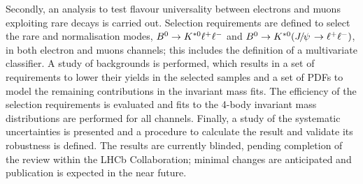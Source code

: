 Secondly, an analysis to test flavour universality between electrons and muons exploiting rare decays is carried out.
Selection requirements are defined to select the rare and normalisation modes, $B^0\rightarrow K^{*0}\ell^+ \ell^-$ 
and $\Bz\to\Kstarz(\jpsi\to\ll)$, in both electron and muons channels; this includes the definition of a 
multivariate classifier. 
A study of backgrounds is performed, which results in
a set of requirements to lower their yields in the selected samples and a set of PDFs to model
the remaining contributions in the invariant mass fits. The efficiency of the selection requirements is evaluated 
and fits to the 4-body invariant mass distributions are performed for all channels. Finally, a study of the systematic uncertainties is presented and
a procedure to calculate the result and validate its robustness is defined. The results are currently blinded,
pending completion of the review within the LHCb Collaboration; minimal changes are anticipated 
and publication is expected in the near future.


